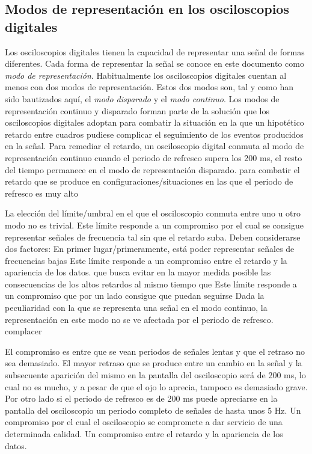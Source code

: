 \subsection{Modos de representación en los osciloscopios digitales}\label{subsec:repmodes}

Los osciloscopios digitales tienen la capacidad de representar una señal de formas diferentes. Cada forma de representar la señal se conoce en este documento como \emph{modo de representación}. Habitualmente los osciloscopios digitales cuentan al menos con dos modos de representación. Estos dos modos son, tal y como han sido bautizados aquí, el \emph{modo disparado} y el \emph{modo continuo}. Los modos de representación continuo y disparado forman parte de la solución que los osciloscopios digitales adoptan para combatir la situación en la que un hipotético retardo entre cuadros pudiese complicar el seguimiento de los eventos producidos en la señal. Para remediar el retardo, un osciloscopio digital conmuta al modo de representación continuo cuando el periodo de refresco supera los 200 ms, el resto del tiempo permanece en el modo de representación disparado.
para combatir el retardo que se produce en configuraciones/situaciones en las que el periodo de refresco es muy alto

La elección del límite/umbral en el que el osciloscopio conmuta entre uno u otro modo no es trivial. Este límite responde a un compromiso 
por el cual se consigue representar señales de frecuencia tal sin que el retardo suba.
Deben considerarse dos factores:
En primer lugar/primeramente, está poder representar señales de frecuencias bajas
Este límite responde a un compromiso entre el retardo y la apariencia de los datos. que busca evitar en la mayor medida posible las consecuencias de los altos retardos al mismo tiempo que 
Este límite responde a un compromiso 
que por un lado consigue que puedan seguirse 
Dada la peculiaridad con la que se representa una señal en el modo continuo, la representación en este modo no se ve afectada por el periodo de refresco.
complacer

El compromiso es entre que se vean periodos de señales lentas y que el retraso no sea demasiado.
El mayor retraso que se produce entre un cambio en la señal y la subsecuente aparición del mismo en la pantalla del osciloscopio será de 200 ms, lo cual no es mucho, y a pesar de que el ojo lo aprecia, tampoco es demasiado grave. Por otro lado si el periodo de refresco es de 200 ms puede apreciarse en la pantalla del osciloscopio un periodo completo de señales de hasta unos 5 Hz. Un compromiso por el cual el osciloscopio se compromete a dar servicio de una determinada calidad. Un compromiso entre el retardo y la apariencia de los datos.

